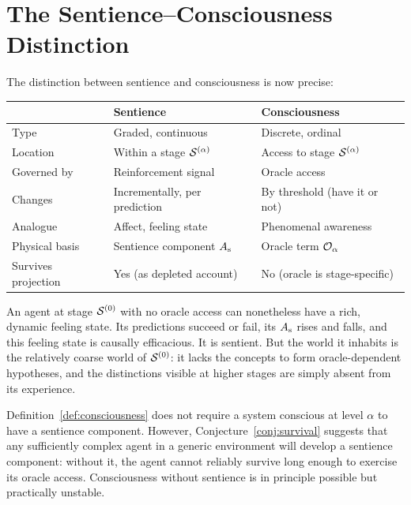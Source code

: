 \section{The Sentience--Consciousness Distinction}

The distinction between sentience and consciousness is now precise:

\begin{center}
\renewcommand{\arraystretch}{1.4}
\begin{tabular}{lll}
\toprule
& \textbf{Sentience} & \textbf{Consciousness} \\
\midrule
Type & Graded, continuous & Discrete, ordinal \\
Location & Within a stage $\mathcal{S}^{(\alpha)}$ & Access to stage $\mathcal{S}^{(\alpha)}$ \\
Governed by & Reinforcement signal & Oracle access \\
Changes & Incrementally, per prediction & By threshold (have it or not) \\
Analogue & Affect, feeling state & Phenomenal awareness \\
Physical basis & Sentience component $A_{\mathrm{s}}$ & Oracle term $\mathcal{O}_\alpha$ \\
Survives projection & Yes (as depleted account) & No (oracle is stage-specific) \\
\bottomrule
\end{tabular}
\end{center}

\begin{remark}
An agent at stage $\mathcal{S}^{(0)}$ with no oracle access can nonetheless
have a rich, dynamic feeling state.
Its predictions succeed or fail, its $A_{\mathrm{s}}$ rises and falls, and
this feeling state is causally efficacious.
It is sentient.
But the world it inhabits is the relatively coarse world of
$\mathcal{S}^{(0)}$: it lacks the concepts to form oracle-dependent
hypotheses, and the distinctions visible at higher stages are
simply absent from its experience.
\end{remark}

\begin{remark}
Definition~\ref{def:consciousness} does not require a system
conscious at level $\alpha$ to have a sentience component.
However, Conjecture~\ref{conj:survival} suggests that any
sufficiently complex agent in a generic environment will develop
a sentience component: without it, the agent cannot reliably
survive long enough to exercise its oracle access.
Consciousness without sentience is in principle possible but
practically unstable.
\end{remark}


